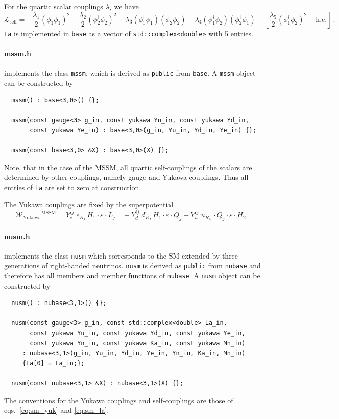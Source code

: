 \documentclass[11pt,a4paper]{article}
\begin{document}
For the quartic scalar couplings $\lambda_i$ we have
\begin{equation} \label{eq:thdm_la}
  \mathcal{L}_{\mathrm{self}} = -\frac{\lambda_1}{2} (\phi_1^\dagger\phi_1)^2 -\frac{\lambda_2}{2} (\phi_2^\dagger\phi_2)^2 - \lambda_3(\phi_1^\dagger\phi_1)(\phi_2^\dagger\phi_2) - \lambda_4(\phi_1^\dagger\phi_2)(\phi_2^\dagger\phi_1)
                                -\left[\frac{\lambda_5}{2} (\phi_1^\dagger\phi_2)^2 + \mathrm{h.c.}\right]~.
\end{equation}
\texttt{La} is implemented in \texttt{base} as a vector of \texttt{std::complex<double>} with 5 entries.

\paragraph{mssm.h}
implements the class \texttt{mssm}, which is derived as \texttt{public} from \texttt{base}. A \texttt{mssm} object can be constructed by
\begin{lstlisting}
  mssm() : base<3,0>() {};
 
  mssm(const gauge<3> g_in, const yukawa Yu_in, const yukawa Yd_in,
       const yukawa Ye_in) : base<3,0>(g_in, Yu_in, Yd_in, Ye_in) {};
 
  mssm(const base<3,0> &X) : base<3,0>(X) {};
\end{lstlisting}
Note, that in the case of the MSSM, all quartic self-couplings of the scalars are determined by other couplings, namely gauge and Yukawa couplings.
Thus all entries of \texttt{La} are set to zero at construction.

The Yukawa couplings are fixed by the superpotential
\begin{equation} \label{eq:mssm_yuk}
  \mathcal{W_\mathrm{Yukawa}}^{\mathrm{MSSM}} = Y_e^{ij} \; {e_R}_i\, H_1\cdot \varepsilon \cdot L_j \quad + Y_d^{ij} \; {d_R}_i \, H_1\cdot \varepsilon \cdot Q_j + Y_u^{ij} \; {u_R}_i \, \cdot Q_j\cdot \varepsilon \cdot H_2 \;.
\end{equation} 

\paragraph{nusm.h}
implements the class \texttt{nusm} which corresponds to the SM extended by three generations of right-handed neutrinos.
\texttt{nusm} is derived as \texttt{public} from \texttt{nubase} and therefore has all members and member functions of \texttt{nubase}. A \texttt{nusm} object can be constructed by
\begin{lstlisting}
  nusm() : nubase<3,1>() {};
 
  nusm(const gauge<3> g_in, const std::complex<double> La_in,
       const yukawa Yu_in, const yukawa Yd_in, const yukawa Ye_in,
       const yukawa Yn_in, const yukawa Ka_in, const yukawa Mn_in)
     : nubase<3,1>(g_in, Yu_in, Yd_in, Ye_in, Yn_in, Ka_in, Mn_in)
     {La[0] = La_in;};
  
  nusm(const nubase<3,1> &X) : nubase<3,1>(X) {};
\end{lstlisting}
The conventions for the Yukawa couplings and self-couplings are those of eqs.~\eqref{eq:sm_yuk} and \eqref{eq:sm_la}.
\end{document}

